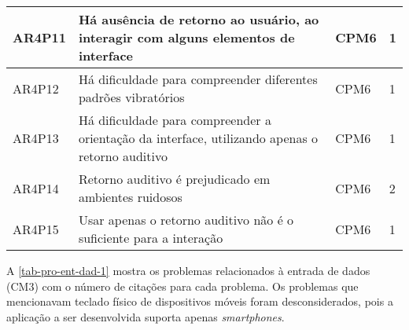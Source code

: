 \begin{table}[htb]
\begin{center}
\begin{tabular}{p{1.2cm}|p{10.0cm}|p{1.4cm}|p{1.4cm}}
      \hline
      AR4P11          & Há ausência de retorno ao usuário, ao interagir com alguns elementos de interface               & CPM6               & 1                 \\
      \hline
      AR4P12          & Há dificuldade para compreender diferentes padrões vibratórios                                  & CPM6               & 1                 \\
      \hline
      AR4P13          & Há dificuldade para compreender a orientação da interface, utilizando apenas o retorno auditivo & CPM6               & 1                 \\
      \hline
      AR4P14          & Retorno auditivo é prejudicado em ambientes ruidosos                                            & CPM6               & 2                 \\
      \hline
      AR4P15          & Usar apenas o retorno auditivo não é o suficiente para a interação                              & CPM6               & 1                 \\
    \end{tabular}
  \end{center}
\end{table}

\newpage

A \autoref{tab-pro-ent-dad-1} mostra os problemas relacionados à entrada de dados (CM3) com o número de citações para cada problema.
Os problemas que mencionavam teclado físico de dispositivos móveis foram desconsiderados, pois a aplicação a ser desenvolvida suporta apenas \emph{smartphones}.

